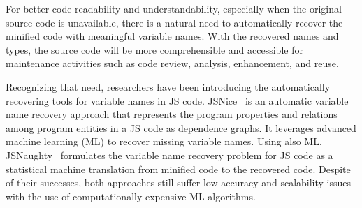 For better code readability and understandability, especially when the
original source code is unavailable, there is a natural need to
automatically recover the minified code with meaningful variable
names. With the recovered names and types, the source code will be
more comprehensible and accessible for maintenance activities such
as code review, analysis, enhancement, and reuse.


Recognizing that need, researchers have been introducing the
automatically recovering tools for variable names in JS code.
%
JSNice~\cite{JSNice2015} is an automatic variable name recovery
approach that represents the program properties and relations among
program entities in a JS code as dependence graphs.
%
It leverages advanced machine learning (ML) to recover missing
variable names.
%
Using also ML, JSNaughty~\cite{JSNaughty2017}
formulates the variable name recovery problem for JS code as a
statistical machine translation from minified code to the
recovered code. Despite of their successes, both approaches still
suffer low accuracy and scalability issues with the use of
computationally expensive ML algorithms.
